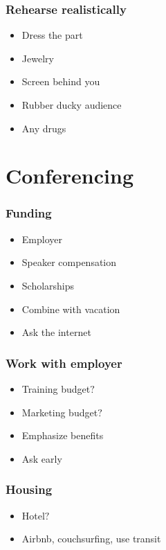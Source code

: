\documentclass{beamer}
\begin{document}
\begin{frame}[fragile]
\frametitle{Rehearse realistically}
\begin{itemize}[<+(1)->]
\item Dress the part
\item Jewelry
\item Screen behind you
\item Rubber ducky audience
\item Any drugs
\end{itemize}
\end{frame}

\section{Conferencing}

\begin{frame}[fragile]
\tableofcontents[currentsection]
\end{frame}

\begin{frame}[fragile]
\frametitle{Funding}
\begin{itemize}[<+(1)->]
\item Employer
\item Speaker compensation
\item Scholarships
\item Combine with vacation
\item Ask the internet
\end{itemize}
\end{frame}

\begin{frame}[fragile]
\frametitle{Work with employer }
\begin{itemize}[<+(1)->]
\item Training budget$?$
\item Marketing budget$?$
\item Emphasize benefits
\item Ask early
\end{itemize}
\end{frame}

\begin{frame}[fragile]
\frametitle{Housing}
\begin{itemize}[<+(1)->]
\item Hotel$?$
\item Airbnb, couchsurfing, use transit
\end{itemize}
\end{frame}
\end{document}
